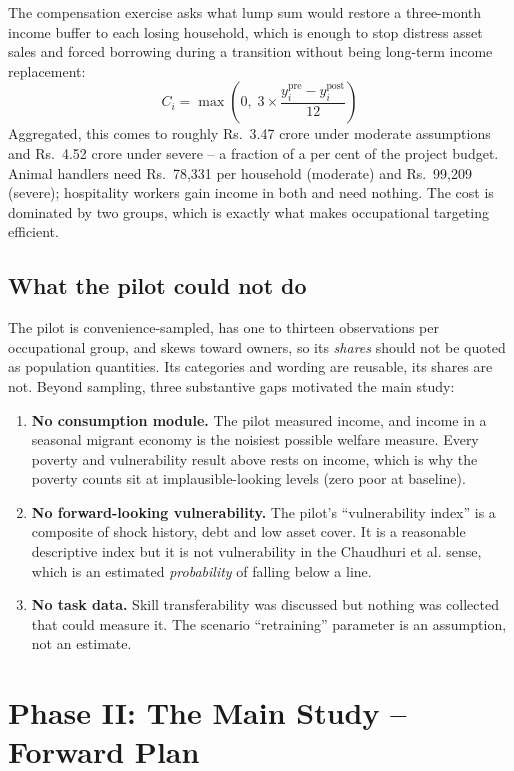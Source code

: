 \documentclass[11pt]{article}
\begin{document}
The compensation exercise asks what lump sum would restore a three-month income buffer to each
losing household, which is enough to stop distress asset sales and forced borrowing during a
transition without being long-term income replacement:
\begin{equation}
C_i = \max\!\left(0,\; 3 \times \frac{y_i^{\text{pre}} - y_i^{\text{post}}}{12}\right)
\end{equation}
Aggregated, this comes to roughly Rs.\ 3.47 crore under moderate assumptions and Rs.\ 4.52
crore under severe -- a fraction of a per cent of the project budget. Animal handlers need
Rs.\ 78,331 per household (moderate) and Rs.\ 99,209 (severe); hospitality workers gain income
in both and need nothing. The cost is dominated by two groups, which is exactly what makes
occupational targeting efficient.

\subsection{What the pilot could not do}

The pilot is convenience-sampled, has one to thirteen observations per occupational group, and
skews toward owners, so its \emph{shares} should not be quoted as population quantities. Its
categories and wording are reusable, its shares are not. Beyond sampling, three substantive
gaps motivated the main study:

\begin{enumerate}
    \item \textbf{No consumption module.} The pilot measured income, and income in a seasonal migrant economy is the noisiest possible welfare measure. Every poverty and vulnerability result above rests on income, which is why the poverty counts sit at implausible-looking levels (zero poor at baseline).
    \item \textbf{No forward-looking vulnerability.} The pilot's ``vulnerability index'' is a composite of shock history, debt and low asset cover. It is a reasonable descriptive index but it is not vulnerability in the Chaudhuri et al. sense, which is an estimated \emph{probability} of falling below a line.
    \item \textbf{No task data.} Skill transferability was discussed but nothing was collected that could measure it. The scenario ``retraining'' parameter is an assumption, not an estimate.
\end{enumerate}

\section{Phase II: The Main Study -- Forward Plan}\label{sec:plan}
\end{document}
